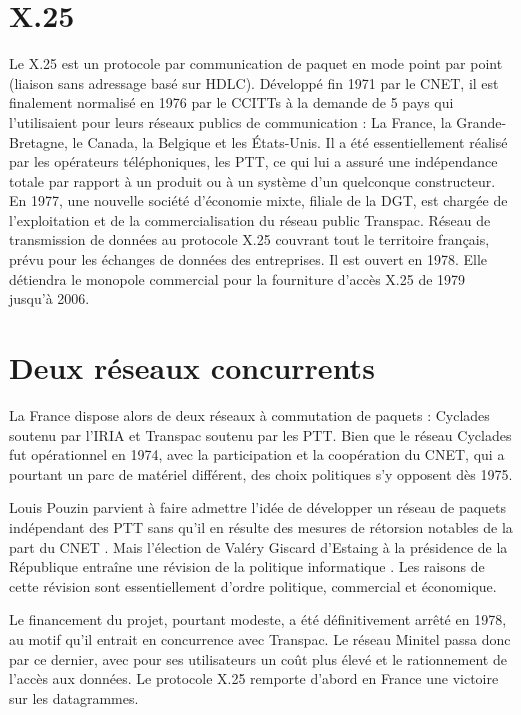 \documentclass[12pt]{report}
\begin{document}
\section{X.25}

Le X.25 est un protocole par communication de paquet en mode point par point\cite{wikix25} (liaison sans adressage basé sur HDLC). Développé fin 1971 par le \gls{CNET}, il est finalement normalisé en 1976 par le \glspl{CCITT} à la demande de 5 pays qui l'utilisaient pour leurs réseaux publics de communication : La France, la Grande-Bretagne, le Canada, la Belgique et les États-Unis. Il a été essentiellement réalisé par les opérateurs téléphoniques, les \gls{PTT}, ce qui lui a assuré une indépendance totale par rapport à un produit ou à un système d'un quelconque constructeur. En 1977, une nouvelle société d'économie mixte, filiale de la DGT, est chargée de l'exploitation et de la commercialisation du réseau public Transpac. Réseau de transmission de données au protocole X.25 couvrant tout le territoire français, prévu pour les échanges de données des entreprises. Il est ouvert en 1978. Elle détiendra le monopole commercial pour la fourniture d'accès X.25 de 1979 jusqu'à 2006\cite{wikitranspac}.

\section{Deux réseaux concurrents}

La France dispose alors de deux réseaux à commutation de paquets : Cyclades soutenu par l'IRIA et Transpac soutenu par les PTT. Bien que le réseau Cyclades fut opérationnel en 1974, avec la participation et la coopération du CNET, qui a pourtant un parc de matériel différent, des choix politiques s'y opposent dès 1975.

Louis Pouzin parvient à faire admettre l'idée de développer un réseau de paquets indépendant des PTT \og sans qu'il en résulte des mesures de rétorsion notables de la part du CNET \fg. Mais l'élection de Valéry Giscard d'Estaing à la présidence de la République entraîne \og une révision de la politique informatique \fg. Les raisons de cette révision sont essentiellement d'ordre politique, commercial et économique.

Le financement du projet, pourtant modeste, a été définitivement arrêté en 1978, au motif qu'il entrait en concurrence avec Transpac. Le réseau Minitel passa donc par ce dernier, avec pour ses utilisateurs un coût plus élevé et le rationnement de l'accès aux données. Le protocole X.25 remporte d'abord en France une victoire sur les datagrammes\cite{wikicyc}.
\end{document}
